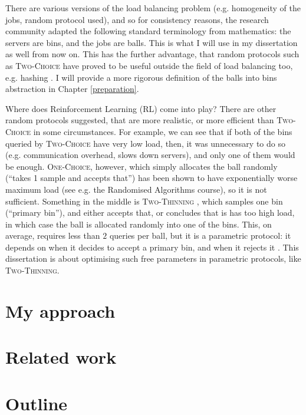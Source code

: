 There are various versions of the load balancing problem (e.g. homogeneity of the jobs, random protocol used), and so for consistency reasons, the research community adapted the following standard terminology from mathematics: the servers are bins, and the jobs are balls. This is what I will use in my dissertation as well from now on. This has the further advantage, that random protocols such as \textsc{Two-Choice} have proved to be useful outside the field of load balancing too, e.g. hashing \cite{azar1999twochoice}. I will provide a more rigorous definition of the balls into bins abstraction in Chapter \ref{preparation}.


Where does Reinforcement Learning (RL) come into play? There are other random protocols suggested, that are more realistic, or more efficient than \textsc{Two-Choice} in some circumstances. For example, we can see that if both of the bins queried by \textsc{Two-Choice} have very low load, then, it was unnecessary to do so (e.g. communication overhead, slows down servers), and only one of them would be enough. \textsc{One-Choice}, however, which simply allocates the ball randomly (``takes 1 sample and accepts that'') has been shown to have exponentially worse maximum load (see e.g. the Randomised Algorithms course), so it is not sufficient. Something in the middle is \textsc{Two-Thinning} \cite{feldheim2021thinning}, which samples one bin (``primary bin''), and either accepts that, or concludes that is has too high load, in which case the ball is allocated randomly into one of the bins. This, on average, requires less than $2$ queries per ball, but it is a parametric protocol: it depends on when it decides to accept a primary bin, and when it rejects it . This dissertation is about optimising such free parameters in parametric protocols, like \textsc{Two-Thinning}.


\section{My approach}


\section{Related work}



\section{Outline}